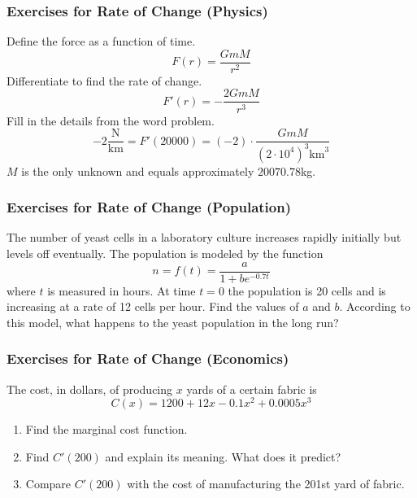 \documentclass[xcolor=dvipsnames]{beamer}
\begin{document}
\begin{frame}
  \frametitle{Exercises for Rate of Change (Physics)}
  Define the force as a function of time.
  \begin{equation}
    \label{eq:ohseesie}
    F(r)=\frac{GmM}{r^{2}}
  \end{equation}
  Differentiate to find the rate of change.
  \begin{equation}
    \label{eq:eiphaila}
    F'(r)=-\frac{2GmM}{r^{3}}
  \end{equation}
  Fill in the details from the word problem.
  \begin{equation}
    \label{eq:luzielee}
    -2\frac{\mbox{N}}{\mbox{km}}=F'(20000)=(-2)\cdot\frac{GmM}{\left(2\cdot{}10^{4}\right)^{3}\mbox{km}^{3}}
  \end{equation}
  $M$ is the only unknown and equals approximately $20070.78$kg.
\end{frame}

\begin{frame}
  \frametitle{Exercises for Rate of Change (Population)}
The number of yeast cells in a laboratory culture increases rapidly
initially but levels off eventually. The population is modeled by the
function
\begin{equation}
  \label{eq:kupeivae}
  n=f(t)=\frac{a}{1+be^{-0.7t}}
\end{equation}
where $t$ is measured in hours. At time $t=0$ the population is 20
cells and is increasing at a rate of 12 cells per hour. Find the
values of $a$ and $b$. According to this model, what happens to the
yeast population in the long run?
\end{frame}

\begin{frame}
  \frametitle{Exercises for Rate of Change (Economics)}
The cost, in dollars, of producing $x$ yards of a certain fabric is
\begin{equation}
  \label{eq:uquuthae}
  C(x)=1200+12x-0.1x^{2}+0.0005x^{3}
\end{equation}
\begin{enumerate}
\item<1-> Find the marginal cost function.
\item<2-> Find $C'(200)$ and explain its meaning. What does it
  predict?
\item<3-> Compare $C'(200)$ with the cost of manufacturing the 201st
  yard of fabric.
\end{enumerate}
\end{frame}
\end{document}
